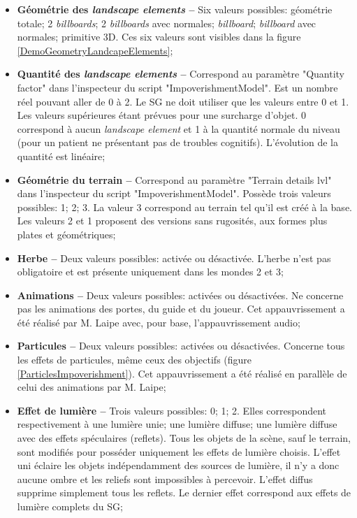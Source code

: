 		\begin{itemize}
			\item \textbf{Géométrie des \textit{landscape elements} --} Six valeurs possibles: géométrie totale; 2 \textit{billboards}; 2 \textit{billboards} avec normales; \textit{billboard}; \textit{billboard} avec normales; primitive 3D. Ces six valeurs sont visibles dans la figure \ref{DemoGeometryLandcapeElements};
			
			\item \textbf{Quantité des \textit{landscape elements} --} Correspond au paramètre "Quantity factor" dans l'inspecteur du script "ImpoverishmentModel". Est un nombre réel pouvant aller de 0 à 2. Le SG ne doit utiliser que les valeurs entre 0 et 1. Les valeurs supérieures étant prévues pour une surcharge d'objet. 0 correspond à aucun \textit{landscape element} et 1 à la quantité normale du niveau (pour un patient ne présentant pas de troubles cognitifs). L'évolution de la quantité est linéaire;
			
			\item \textbf{Géométrie du terrain --} Correspond au paramètre "Terrain details lvl" dans l'inspecteur du script "ImpoverishmentModel". Possède trois valeurs possibles: 1; 2; 3. La valeur 3 correspond au terrain tel qu'il est créé à la base. Les valeurs 2 et 1 proposent des versions sans rugosités, aux formes plus plates et géométriques;
			
			\item \textbf{Herbe --} Deux valeurs possibles: activée ou désactivée. L'herbe n'est pas obligatoire et est présente uniquement dans les mondes 2 et 3;
			
			\item \textbf{Animations --} Deux valeurs possibles: activées ou désactivées. Ne concerne pas les animations des portes, du guide et du joueur. Cet appauvrissement a été réalisé par M. Laipe avec, pour base, l'appauvrissement audio;
			
			\item \textbf{Particules --} Deux valeurs possibles: activées ou désactivées. Concerne tous les effets de particules, même ceux des objectifs (figure \ref{ParticlesImpoverishment}). Cet appauvrissement a été réalisé en parallèle de celui des animations par M. Laipe;
			
			\item \textbf{Effet de lumière --} Trois valeurs possibles: 0; 1; 2. Elles correspondent respectivement à une lumière unie; une lumière diffuse; une lumière diffuse avec des effets spéculaires (reflets). Tous les objets de la scène, sauf le terrain, sont modifiés pour posséder uniquement les effets de lumière choisis. L'effet uni éclaire les objets indépendamment des sources de lumière, il n'y a donc aucune ombre et les reliefs sont impossibles à percevoir. L'effet diffus supprime simplement tous les reflets. Le dernier effet correspond aux effets de lumière complets du SG;
			

\end{itemize}
